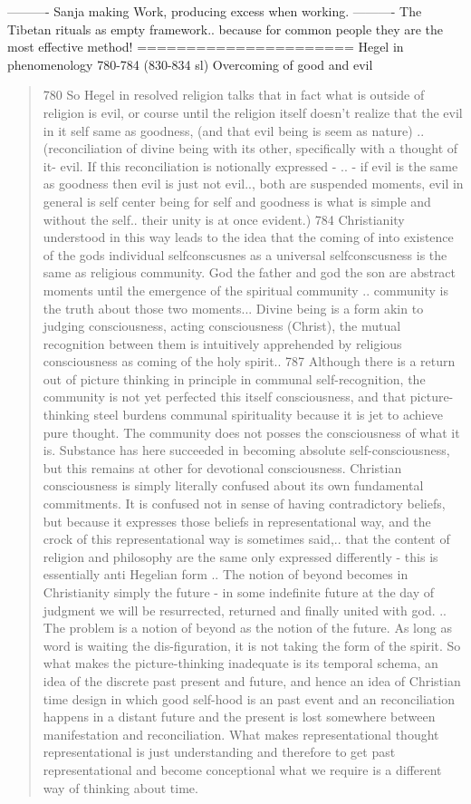 \documentclass{book}
\begin{document}
----------
Sanja making Work, producing excess when working.
----------
The Tibetan rituals as empty framework.. because for common people they are the most effective method!
======================
Hegel in phenomenology 780-784 (830-834 sl) Overcoming of good and evil
\begin{quotation}
780 So Hegel in resolved religion talks that in fact what is outside of religion is evil, or course until the religion itself doesn't realize that the evil in it self same as goodness, (and that evil being is seem as nature) .. (reconciliation of divine being with its other, specifically with a thought of it- evil. If this reconciliation is notionally expressed - .. - if evil is the same as goodness then evil is just not evil.., both are suspended moments, evil in general is self center being for self and goodness is what is simple and without the self.. their unity is at once evident.)
784 Christianity understood in this way leads to the idea that the coming of into existence of the gods individual selfconscusnes as a universal selfconscusness is the same as religious community. God the father and god the son are abstract moments until the emergence of the spiritual community .. community is the truth about those two moments... Divine being is a form akin to judging consciousness, acting consciousness (Christ), the mutual recognition between them is intuitively apprehended by religious consciousness as coming of the holy spirit..
787 Although there is a return out of picture thinking in principle in communal self-recognition, the community is not yet perfected this itself consciousness, and that picture-thinking steel burdens communal spirituality because it is jet to achieve pure thought. The community does not posses the consciousness of what it is. Substance has here succeeded in becoming absolute self-consciousness, but this remains at other for devotional consciousness. Christian consciousness is simply literally confused about its own fundamental commitments. It is confused not in sense of having contradictory beliefs, but because it expresses those beliefs in representational way, and the crock of this representational way is sometimes said,.. that the content of religion and philosophy are the same only expressed differently - this is essentially anti Hegelian form .. The notion of beyond becomes in Christianity simply the future - in some indefinite future at the day of judgment we will be resurrected, returned and finally united with god. .. The problem is a notion of beyond as the notion of the future. As long as word is waiting the dis-figuration, it is not taking the form of the spirit. So what makes the picture-thinking inadequate is its temporal schema, an idea of the discrete past present and future, and hence an idea of Christian time design in which good self-hood is an past event and an reconciliation happens in a distant future and the present is lost somewhere between manifestation and reconciliation. What makes representational thought representational is just understanding and therefore to get past representational and become conceptional what we require is a different way of thinking about time.

\end{quotation}
\end{document}

